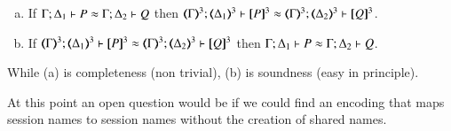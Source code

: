 \begin{comment}
\begin{proof}[Sketch]
For completeness, we 
consider the \HO process $P = {\bbout{k}{\abs{x} Q} P_1} \Par \binp{k}{X} P_2$. We have that
\[
P \red P_1 \Par P_2 \subst{\abs{x}Q}{X}
\]
In the target language, this reduction is mimicked as follows:
\begin{eqnarray*}
\pmap{P}{2} & = & \newsp{a}{\bout{k}{a} (\pmap{P_1}{3} \Par \repl{} \binp{a}{y} \binp{y}{x} \pmap{Q}{3})\,} 
                  \Par \binp{k}{x} \pmap{P_2}{3} \\
            & \red & \newsp{a}{\pmap{P_1}{3} \Par \repl{} \binp{a}{y} \binp{y}{x} \pmap{Q}{3} 
                  \Par  \pmap{P_2}{3}\subst{a}{x}}
\end{eqnarray*}
\qed
\end{proof}
\end{comment}


\begin{conjecture}
\begin{enumerate}[a)]
\item
If
$ \Gamma; \Delta_1 \vdash  P  \approx  \Gamma;  \Delta_2 \vdash Q $
then
$\wbb{\mapt{\Gamma}^{3}}{\ell}{\mapt{\Delta_1}^{3}}{\map{P}^{3}}{\mapt{\Delta_2}^{3}}
{\map{Q}^{3}}$.
\item  
If 
$\wbb{\mapt{\Gamma}^{3}}{\ell}{\mapt{\Delta_1}^{3}}{\map{P}^{3}}{\mapt{\Delta_2}^{3}}
{\map{Q}^{3}}$
then 
$ \Gamma; \Delta_1 \vdash  P  \approx  \Gamma;  \Delta_2 \vdash Q $.
\end{enumerate}
While (a) is  completeness (non trivial), (b) is soundness  (easy in principle).
\end{conjecture}

At this point an open  question would be if we could find an encoding that maps
session names to session names without the creation of shared names.


